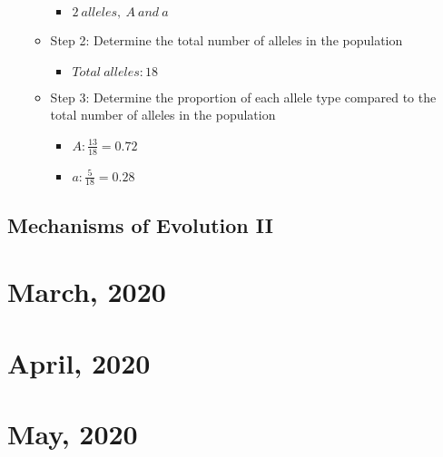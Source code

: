 \documentclass[10pt, oneside]{article}
\begin{document}
\begin{itemize}
\begin{itemize}
\begin{itemize}
\item $ 2\ alleles,\ A \ and \ a $
\end{itemize}
\item Step 2: Determine the total number of alleles in the population
\begin{itemize}
\item $ Total\ alleles: 18$
\end{itemize}
\item Step 3: Determine the proportion of each allele type compared to the total number of alleles in the 
population
\begin{itemize}
\item $ A: \frac{13}{18} = 0.72$
\item$ a: \frac{5}{18} = 0.28$
\end{itemize}
\end{itemize}
\end{itemize} 

\subsection{Mechanisms of Evolution II}


\section{March, 2020}

\section{April, 2020}

\section{May, 2020}


\printnoidxglossaries
\end{document}
